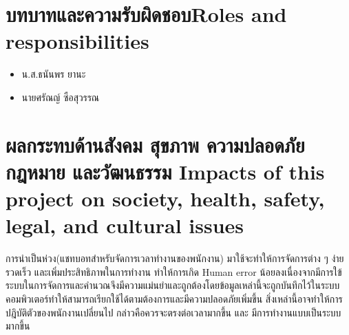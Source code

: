 \section{\ifcpe บทบาทและความรับผิดชอบ\else Roles and responsibilities\fi}
\begin{itemize}
    \item น.ส.ธนันพร ยานะ
    \item นายศรัณญ์ ซือสุวรรณ
\end{itemize}

\section{\ifcpe%
ผลกระทบด้านสังคม สุขภาพ ความปลอดภัย กฎหมาย และวัฒนธรรม
\else%
Impacts of this project on society, health, safety, legal, and cultural issues
\fi}
การนำเป็นห่วง(แชทบอทสำหรับจัดการเวลาทำงานของพนักงาน) มาใช้จะทำให้การจัดการต่าง ๆ ง่าย รวดเร็ว และเพิ่มประสิทธิภาพในการทำงาน ทำให้การเกิด Human error น้อยลงเนื่องจากมีการใข้ระบบในการจัดการและคำนวณจึงมีความแม่นยำและถูกต้องโดยข้อมูลเหล่านี้จะถูกบันทึกไว้ในระบบคอมพิวเตอร์ทำให้สามารถเรียกใช้ได้ตามต้องการและมีความปลอดภัยเพิ่มขึ้น สิ่งเหล่านี้อาจทำให้การปฎิบัติตัวของพนักงานเปลี่ยนไป กล่าวคือควรจะตรงต่อเวลามากขึ้น และ มีการทำงานแบบเป็นระบบมากขึ้น